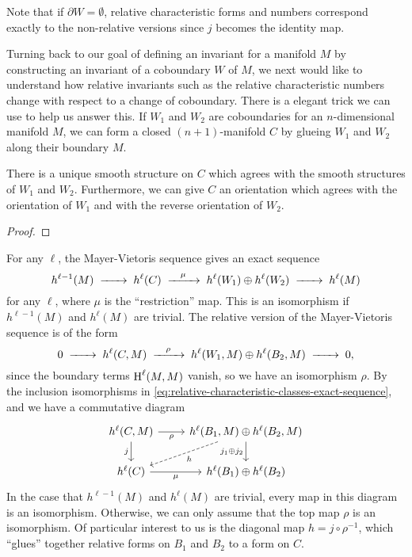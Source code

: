 \begin{remark}
	Note that if $\partial W=\emptyset$, relative characteristic forms and numbers correspond exactly to the non-relative versions since $j$ becomes the identity map.
\end{remark}

Turning back to our goal of defining an invariant for a manifold $M$ by constructing an invariant of a coboundary $W$ of $M$, we next would like to understand how relative invariants such as the relative characteristic numbers change with respect to a change of coboundary.
There is a elegant trick we can use to help us answer this. If $W_1$ and $W_2$ are coboundaries for an $n$-dimensional manifold $M$, we can form a closed $(n+1)$-manifold $C$ by glueing $W_1$ and $W_2$ along their boundary $M$. 

\begin{proposition} 
	There is a unique smooth structure on $C$ which agrees with the smooth structures of $W_1$ and $W_2$. Furthermore, we can give $C$ an orientation which agrees with the orientation of $W_1$ and with the reverse orientation of $W_2$.
\end{proposition}
\begin{proof}
\end{proof}

For any $\ell$, the Mayer-Vietoris sequence gives an exact sequence
\[
	h^{\ell-1}(M)\lkxto h^{\ell}(C) \lkxto[\mu] h^{\ell}(W_1)\oplus h^{\ell}(W_2) \lkxto h^{\ell}(M)
\]
for any $\ell$, where $\mu$ is the ``restriction'' map. This is an isomorphism if $h^{\ell-1}(M)$ and $h^\ell(M)$ are trivial.
The relative version of the Mayer-Vietoris sequence is of the form
\[
	0 \lkxto h^{\ell}(C, M) \lkxto[\rho] h^{\ell}(W_1,M)\oplus h^{\ell}(B_2,M) \lkxto 0,
\]
since the boundary terms $\operatorname{H}^\ell(M,M)$ vanish, so we have an isomorphism $\rho$.
By the inclusion isomorphisms in \cref{eq:relative-characteristic-classes-exact-sequence}, and we have a commutative diagram
\begin{equation}\label{eq:closing_coboundaries_square}
	\begin{tikzcd}
		{h^{\ell}(C,M)} & {h^{\ell}(B_1,M)\oplus h^{\ell}(B_2,M)} \\
		{h^{\ell}(C)} & {h^{\ell}(B_1)\oplus h^{\ell}(B_2)}
		\arrow["j_1\oplus j_2"', from=1-2, to=2-2]
		\arrow["\rho"', from=1-1, to=1-2]
		\arrow["j"', from=1-1, to=2-1]
		\arrow["\mu"', from=2-1, to=2-2]
		\arrow["h", from=1-2, to=2-1, dashed]
	\end{tikzcd}
\end{equation}
In the case that $h^{\ell-1}(M)$ and $h^\ell(M)$ are trivial, every map in this diagram is an isomorphism. Otherwise, we can only assume that the top map $\rho$ is an isomorphism.
Of particular interest to us is the diagonal map $h = j\circ \rho^{-1}$, which ``glues'' together relative forms on $B_1$ and $B_2$ to a form on $C$.

